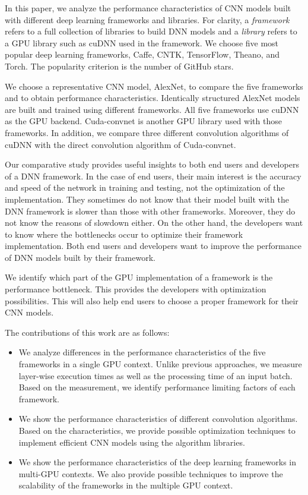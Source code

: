 In this paper, we analyze the performance characteristics of CNN models built with different deep learning frameworks and libraries. For clarity, a \textit{framework} refers to a full collection of libraries to build DNN models and a \textit{library} refers to a GPU library such as cuDNN used in the framework. We choose five most popular deep learning frameworks, Caffe\cite{jia2014caffe}, CNTK\cite{cntk}, TensorFlow\cite{tensorflow2015-whitepaper}, Theano\cite{DBLP:journals/corr/Al-RfouAAa16}, and Torch\cite{torch}. The popularity criterion is the number of GitHub stars\cite{github}.

We choose a representative CNN model, AlexNet\cite{krizhevsky2012imagenet}, to compare the five frameworks and to obtain performance characteristics. Identically structured AlexNet models are built and trained using different frameworks. All five frameworks use cuDNN as the GPU backend. Cuda-convnet\cite{cuda-convnet} is another GPU library used with those frameworks. In addition, we compare three different convolution algorithms of cuDNN with the direct convolution algorithm of Cuda-convnet.

Our comparative study provides useful insights to both end users and developers of a DNN framework. In the case of end users, their main interest is the accuracy and speed of the network in training and testing, not the optimization of the implementation. They sometimes do not know that their model built with the DNN framework is slower than those with other frameworks. Moreover, they do not know the reasons of slowdown either. On the other hand, the developers want to know where the bottlenecks occur to optimize their framework implementation. Both end users and developers want to improve the performance of DNN models built by their framework.

We identify which part of the GPU implementation of a framework is the performance bottleneck. This provides the developers with optimization possibilities. This will also help end users to choose a proper framework for their CNN models. 

The contributions of this work are as follows:
\begin{itemize}
\item We analyze differences in the performance characteristics of the five frameworks in a single GPU context. Unlike previous approaches, we measure layer-wise execution times as well as the processing time of an input batch. Based on the measurement, we identify performance limiting factors of each framework. 

\item We show the performance characteristics of different convolution algorithms. Based on the characteristics, we provide possible optimization techniques to implement efficient CNN models using the algorithm libraries.

\item We show the performance characteristics of the deep learning frameworks in multi-GPU contexts. We also provide possible techniques to improve the scalability of the frameworks in the multiple GPU context.
\end{itemize}

